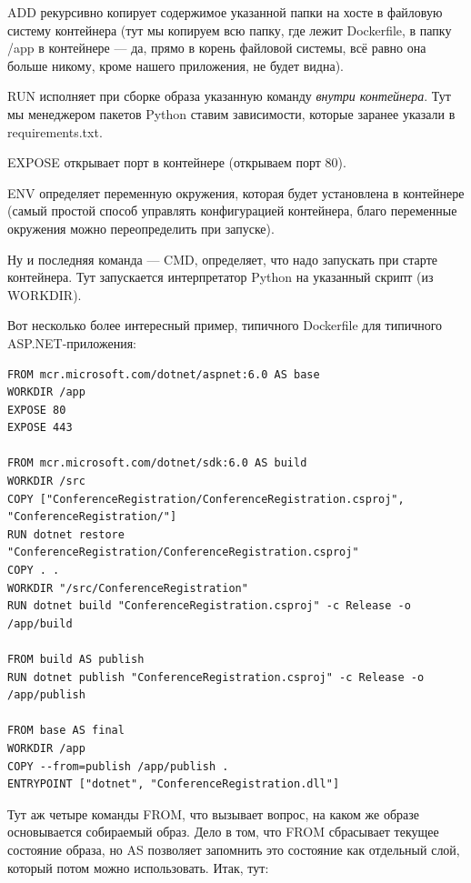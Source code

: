 \documentclass[a5paper]{article}
\begin{document}
ADD рекурсивно копирует содержимое указанной папки на хосте в файловую систему контейнера (тут мы копируем всю папку, где лежит Dockerfile, в папку /app в контейнере --- да, прямо в корень файловой системы, всё равно она больше никому, кроме нашего приложения, не будет видна).

RUN исполняет при сборке образа указанную команду \emph{внутри контейнера}. Тут мы менеджером пакетов Python ставим зависимости, которые заранее указали в requirements.txt.

EXPOSE открывает порт в контейнере (открываем порт 80).

ENV определяет переменную окружения, которая будет установлена в контейнере (самый простой способ управлять конфигурацией контейнера, благо переменные окружения можно переопределить при запуске).

Ну и последняя команда --- CMD, определяет, что надо запускать при старте контейнера. Тут запускается интерпретатор Python на указанный скрипт (из WORKDIR).

Вот несколько более интересный пример, типичного Dockerfile для типичного ASP.NET-приложения:

\begin{verbatim}
FROM mcr.microsoft.com/dotnet/aspnet:6.0 AS base
WORKDIR /app
EXPOSE 80
EXPOSE 443

FROM mcr.microsoft.com/dotnet/sdk:6.0 AS build
WORKDIR /src
COPY ["ConferenceRegistration/ConferenceRegistration.csproj", "ConferenceRegistration/"]
RUN dotnet restore "ConferenceRegistration/ConferenceRegistration.csproj"
COPY . .
WORKDIR "/src/ConferenceRegistration"
RUN dotnet build "ConferenceRegistration.csproj" -c Release -o /app/build

FROM build AS publish
RUN dotnet publish "ConferenceRegistration.csproj" -c Release -o /app/publish

FROM base AS final
WORKDIR /app
COPY --from=publish /app/publish .
ENTRYPOINT ["dotnet", "ConferenceRegistration.dll"]
\end{verbatim}

Тут аж четыре команды FROM, что вызывает вопрос, на каком же образе основывается собираемый образ. Дело в том, что FROM сбрасывает текущее состояние образа, но AS позволяет запомнить это состояние как отдельный слой, который потом можно использовать. Итак, тут:
\end{document}
